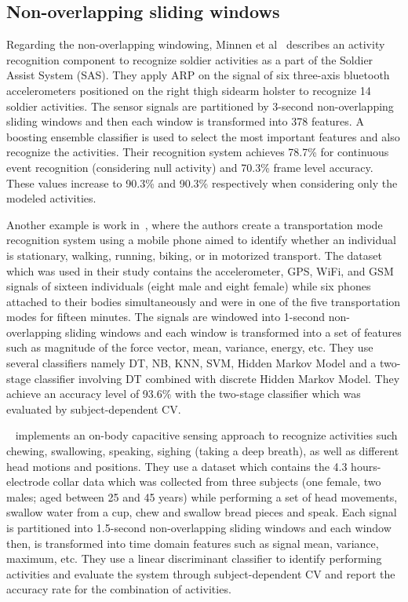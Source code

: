 \documentclass[sensors,article,submit,moreauthors,pdftex]{Definitions/mdpi}
\begin{document}
\subsection{Non-overlapping sliding windows}
Regarding the non-overlapping windowing, Minnen et al~\cite{minnen2007recognizing} describes an activity recognition component to recognize soldier activities as a part of the Soldier Assist System (SAS). They apply ARP on the signal of six three-axis bluetooth accelerometers
positioned on the right thigh sidearm holster to recognize 14 soldier activities. The sensor signals are partitioned by 3-second non-overlapping sliding windows and then each window is transformed into 378 features. A boosting ensemble classifier is used to select the most important features and also recognize the activities. Their recognition system achieves 78.7\% for continuous event recognition (considering null activity)
and 70.3\% frame level accuracy. These values increase to
90.3\% and 90.3\% respectively when considering only the
modeled activities. 

Another example is work in~\cite{reddy2010using}, where the authors create a transportation mode recognition system using a mobile phone aimed to identify whether
an individual is stationary, walking, running, biking, or in motorized transport. The dataset which was used in their study contains the accelerometer, GPS, WiFi, and GSM signals of sixteen individuals (eight male and eight female) while six phones attached to their bodies simultaneously and were in one of the five transportation modes for fifteen minutes. The signals are windowed into 1-second non-overlapping sliding windows and each window is transformed into a set of features such as magnitude of the force vector, mean, variance, energy, etc. They use several classifiers namely DT, NB, KNN, SVM, Hidden Markov
Model and a two-stage classifier involving DT combined with discrete
Hidden Markov Model. They achieve an accuracy level of 93.6\% with 
the two-stage classifier which was evaluated by subject-dependent CV.

~\cite{cheng2010active} implements an on-body capacitive sensing approach to recognize activities such chewing, swallowing, speaking, sighing (taking a deep breath), as well as
different head motions and positions. They use a dataset which contains the 4.3 hours-electrode collar data which was collected from three subjects (one female, two males; aged between 25 and 45 years) while performing a set of head movements, swallow water from a cup, chew and swallow bread pieces and speak. Each signal is partitioned into 1.5-second non-overlapping sliding windows and each window then, is transformed into time domain features such as signal mean, variance, maximum, etc. They use a linear discriminant
classifier to identify performing activities and evaluate the system through subject-dependent CV and report the accuracy rate for the combination of activities.  
\end{document}
